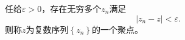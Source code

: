 \begin{definition}[聚点]
    任给$\varepsilon>0$，存在无穷多个$z_{n}$满足
    \begin{equation}
        \left|z_{n}-z\right|<\varepsilon .
        \nonumber
    \end{equation}
    则称$z$为复数序列$\left\{z_{n}\right\}$的一个聚点。
\end{definition}







